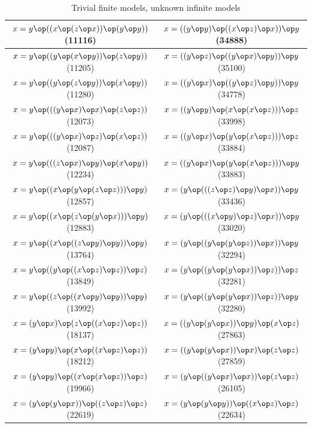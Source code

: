 \begin{table}[h]
\begin{tabular}{|c|c|}
$x = y \op ((x \op (z \op x)) \op (y \op y))$ (11116) & $x = ((y \op y) \op ((x \op z) \op x)) \op y$ (34888) \\ \hline
$x = y \op ((y \op (x \op y)) \op (z \op y))$ (11205) & $x = ((y \op z) \op ((y \op x) \op y)) \op y$ (35100) \\ \hline
$x = y \op ((y \op (z \op y)) \op (x \op y))$ (11280) & $x = ((y \op x) \op ((y \op z) \op y)) \op y$ (34778) \\ \hline
$x = y \op (((y \op x) \op x) \op (z \op z))$ (12073) & $x = ((y \op y) \op (x \op (x \op z))) \op z$ (33998) \\ \hline
$x = y \op (((y \op x) \op z) \op (x \op z))$ (12087) & $x = ((y \op x) \op (y \op (x \op z))) \op z$ (33884) \\ \hline
$x = y \op (((z \op x) \op y) \op (x \op y))$ (12234) & $x = ((y \op x) \op (y \op (x \op z))) \op y$ (33883) \\ \hline
$x = y \op ((x \op (y \op (z \op z))) \op y)$ (12857) & $x = (y \op (((z \op z) \op y) \op x)) \op y$ (33436) \\ \hline
$x = y \op ((x \op (z \op (y \op x))) \op y)$ (12883) & $x = (y \op (((x \op y) \op z) \op x)) \op y$ (33020) \\ \hline
$x = y \op ((x \op ((z \op y) \op y)) \op y)$ (13764) & $x = (y \op ((y \op (y \op z)) \op x)) \op y$ (32294) \\ \hline
$x = y \op ((y \op ((x \op z) \op z)) \op z)$ (13849) & $x = (y \op ((y \op (y \op x)) \op z)) \op z$ (32281) \\ \hline
$x = y \op ((z \op ((x \op y) \op y)) \op y)$ (13992) & $x = (y \op ((y \op (y \op x)) \op z)) \op y$ (32280) \\ \hline
$x = (y \op x) \op (z \op ((x \op z) \op z))$ (18137) & $x = ((y \op (y \op x)) \op y) \op (x \op z)$ (27863) \\ \hline
$x = (y \op y) \op (x \op ((x \op z) \op z))$ (18212) & $x = ((y \op (y \op x)) \op x) \op (z \op z)$ (27859) \\ \hline
$x = (y \op y) \op ((x \op (x \op z)) \op z)$ (19966) & $x = (y \op ((y \op x) \op x)) \op (z \op z)$ (26105) \\ \hline
$x = (y \op (y \op x)) \op ((z \op z) \op z)$ (22619) & $x = (y \op (y \op y)) \op ((x \op z) \op z)$ (22634) \\ \hline
\end{tabular}
\caption{Trivial finite models, unknown infinite models}
\label{table2}
\end{table}

